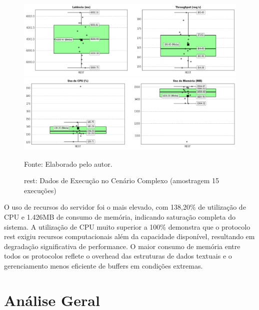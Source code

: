 \begin{figure}[H]
    \caption{\gls{rest}: Dados de Execução no Cenário Complexo (amostragem 15 execuções)}
    \label{fig:5-Complexo-REST-k6}
    \centering
    \includegraphics[width=1\linewidth]{imagens//resultados/5-resultados-Complexo-REST-k6.png}
    \includegraphics[width=1\linewidth]{imagens//resultados/5-resultados-Complexo-REST-prometheus.png}    
    {\par \raggedright \footnotesize Fonte: Elaborado pelo autor.\par}
\end{figure}


O uso de recursos do servidor foi o mais elevado, com 138,20\% de utilização de CPU e 1.426MB de consumo de memória, indicando saturação completa do sistema. A utilização de CPU muito superior a 100\% demonstra que o protocolo \gls{rest} exigiu recursos computacionais além da capacidade disponível, resultando em degradação significativa de performance. O maior consumo de memória entre todos os protocolos reflete o overhead das estruturas de dados textuais e o gerenciamento menos eficiente de buffers em condições extremas.

\section{Análise Geral}

